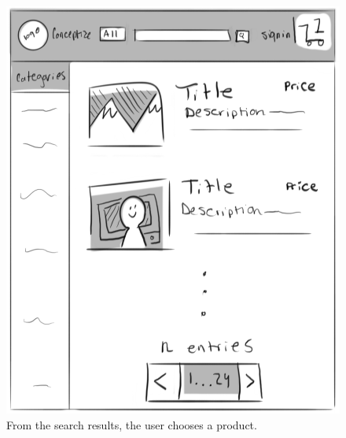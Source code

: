 \documentclass[]{article}
\begin{document}
\begin{enumerate}
		\begin{figure}
		  \includegraphics[width=\linewidth]{./pictures/search_results.png}
		  \caption{From the search results, the user chooses a product.}
		  \label{fig:buyer2}
		\end{figure}		
		

\end{enumerate}
\end{document}
